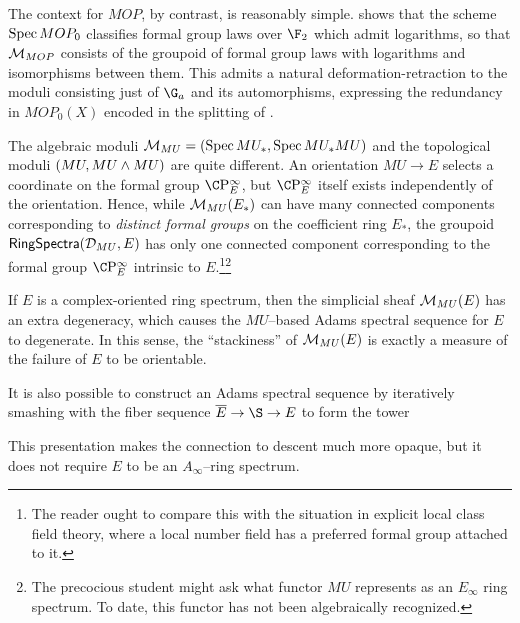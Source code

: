 \begin{example}\label{ContextOfMOPExample}
The context for $MOP$, by contrast, is reasonably simple.   shows that the scheme $\operatorname{Spec} MOP_0$ classifies formal group laws over $\F_2$ which admit logarithms, so that $\mathcal{M}_{MOP}$ consists of the groupoid of formal group laws with logarithms and isomorphisms between them.  This admits a natural deformation-retraction to the moduli consisting just of $\G_a$ and its automorphisms, expressing the redundancy in $MOP_0(X)$ encoded in the splitting of .
\end{example}

\begin{remark}
The algebraic moduli $\mathcal{M}_{MU} = (\operatorname{Spec} MU_*, \operatorname{Spec} MU_* MU)$ and the topological moduli $(MU, MU \wedge MU)$ are quite different.  An orientation $MU \to E$ selects a coordinate on the formal group $\CP^\infty_E$, but $\CP^\infty_E$ itself exists independently of the orientation.  Hence, while $\mathcal{M}_{MU}(E_*)$ can have many connected components corresponding to \emph{distinct formal groups} on the coefficient ring $E_*$, the groupoid $\mathsf{RingSpectra}(\mathcal{D}_{MU}, E)$ has only one connected component corresponding to the formal group $\CP^\infty_E$ intrinsic to $E$.\footnote{The reader ought to compare this with the situation in explicit local class field theory, where a local number field has a preferred formal group attached to it.}\footnote{The precocious student might ask what functor $MU$ represents as an $E_\infty$ ring spectrum.  To date, this functor has not been algebraically recognized.}
\end{remark}

\begin{remark}\label{StackinessMeasuresNonorientability}
If $E$ is a complex-oriented ring spectrum, then the simplicial sheaf $\mathcal{M}_{MU}(E)$ has an extra degeneracy, which causes the $MU$--based Adams spectral sequence for $E$ to degenerate.  In this sense, the ``stackiness'' of $\mathcal{M}_{MU}(E)$ is exactly a measure of the failure of $E$ to be orientable.
\end{remark}

\begin{remark}
It is also possible to construct an Adams spectral sequence by iteratively smashing with the fiber sequence $\overline E \to \S \to E$ to form the tower
\begin{center}
\end{center}
This presentation makes the connection to descent much more opaque, but it does not require $E$ to be an $A_\infty$--ring spectrum.
\end{remark}


